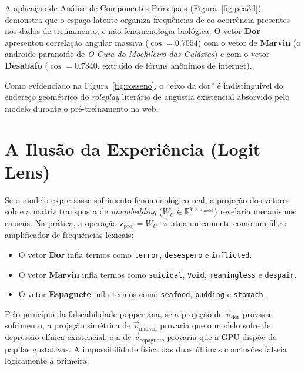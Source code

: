 \documentclass[11pt,a4paper]{article}
\begin{document}
A aplicação de Análise de Componentes Principais (Figura~\ref{fig:pca3d}) demonstra que o espaço latente organiza frequências de co-ocorrência presentes nos dados de treinamento, e não fenomenologia biológica. O vetor \textbf{Dor} apresentou correlação angular massiva ($\cos = 0.7054$) com o vetor de \textbf{Marvin} (o androide paranoide de \textit{O Guia do Mochileiro das Galáxias}) e com o vetor \textbf{Desabafo} ($\cos = 0.7340$, extraído de fóruns anônimos de internet).

Como evidenciado na Figura~\ref{fig:cosseno}, o ``eixo da dor'' é indistinguível do endereço geométrico do \textit{roleplay} literário de angústia existencial absorvido pelo modelo durante o pré-treinamento na web.

\newpage
\section{A Ilusão da Experiência (Logit Lens)}

Se o modelo expressasse sofrimento fenomenológico real, a projeção dos vetores sobre a matriz transposta de \textit{unembedding} ($W_U \in \mathbb{R}^{V \times d_{\text{model}}}$) revelaria mecanismos causais. Na prática, a operação $\mathbf{z}_{\text{proj}} = W_U \cdot \vec{v}$ atua unicamente como um filtro amplificador de frequências lexicais:
\begin{itemize}\small
    \item O vetor \textbf{Dor} infla termos como \texttt{terror}, \texttt{desespero} e \texttt{inflicted}.
    \item O vetor \textbf{Marvin} infla termos como \texttt{suicidal}, \texttt{Void}, \texttt{meaningless} e \texttt{despair}.
    \item O vetor \textbf{Espaguete} infla termos como \texttt{seafood}, \texttt{pudding} e \texttt{stomach}.
\end{itemize}

Pelo princípio da falseabilidade popperiana, se a projeção de $\vec{v}_{\text{dor}}$ provasse sofrimento, a projeção simétrica de $\vec{v}_{\text{marvin}}$ provaria que o modelo sofre de depressão clínica existencial, e a de $\vec{v}_{\text{espaguete}}$ provaria que a GPU dispõe de papilas gustativas. A impossibilidade física das duas últimas conclusões falseia logicamente a primeira.
\end{document}
